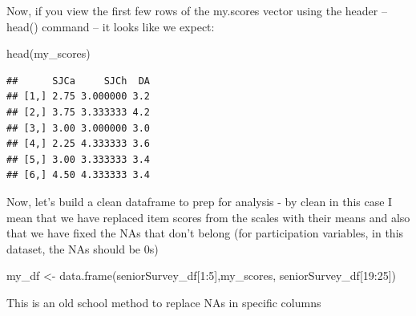 \documentclass[
]{book}
\newenvironment{Shaded}{\begin{snugshade}}{\end{snugshade}}
\newcommand{\DecValTok}[1]{\textcolor[rgb]{0.00,0.00,0.81}{#1}}
\newcommand{\FunctionTok}[1]{\textcolor[rgb]{0.00,0.00,0.00}{#1}}
\newcommand{\NormalTok}[1]{#1}
\newcommand{\OtherTok}[1]{\textcolor[rgb]{0.56,0.35,0.01}{#1}}
\newcommand{\SpecialCharTok}[1]{\textcolor[rgb]{0.00,0.00,0.00}{#1}}
\begin{document}
\begin{Shaded}
\end{Shaded}

Now, if you view the first few rows of the my.scores vector using the header -- head() command -- it looks like we expect:

\begin{Shaded}
\begin{Highlighting}[]
\FunctionTok{head}\NormalTok{(my\_scores)}
\end{Highlighting}
\end{Shaded}

\begin{verbatim}
##      SJCa     SJCh  DA
## [1,] 2.75 3.000000 3.2
## [2,] 3.75 3.333333 4.2
## [3,] 3.00 3.000000 3.0
## [4,] 2.25 4.333333 3.6
## [5,] 3.00 3.333333 3.4
## [6,] 4.50 4.333333 3.4
\end{verbatim}

Now, let's build a clean dataframe to prep for analysis - by clean in this case I mean that we have replaced item scores from the scales with their means and also that we have fixed the NAs that don't belong (for participation variables, in this dataset, the NAs should be 0s)

\begin{Shaded}
\begin{Highlighting}[]
\NormalTok{my\_df }\OtherTok{\textless{}{-}} \FunctionTok{data.frame}\NormalTok{(seniorSurvey\_df[}\DecValTok{1}\SpecialCharTok{:}\DecValTok{5}\NormalTok{],my\_scores, seniorSurvey\_df[}\DecValTok{19}\SpecialCharTok{:}\DecValTok{25}\NormalTok{])}
\end{Highlighting}
\end{Shaded}

This is an old school method to replace NAs in specific columns

\begin{Shaded}
\end{Shaded}
\end{document}
